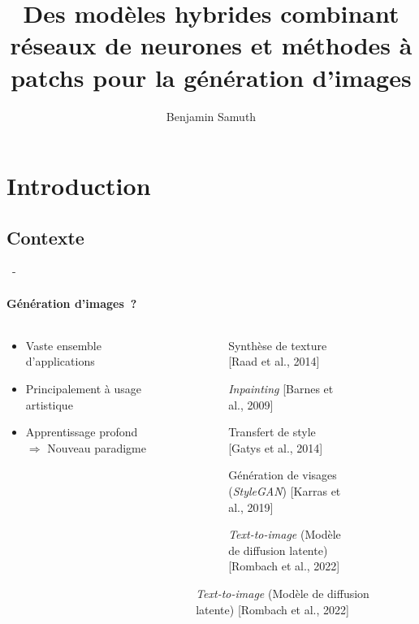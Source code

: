 \documentclass[aspectratio=169, 22pt]{beamer}
\title[Modèles hybrides pour la génération d'images]{Des modèles hybrides combinant réseaux de neurones et méthodes à patchs pour la génération d'images}
\subtitle{}
\author[Benjamin Samuth]{Benjamin Samuth}
\institute[Normandie University]{Normandie Univ, UNICAEN, ENSICAEN, CNRS, GREYC, Caen, FRANCE}
\begin{document}
\begin{frame}
  \titlepage
\end{frame}

\section{Introduction}

\subsection{Contexte}
\begin{frame}{\secname~- \subsecname}
  \framesubtitle{Génération d'images~?}
  \begin{columns}
    \begin{column}{0.5\linewidth}      
      \begin{itemize}
      \item Vaste ensemble d'applications
      \item Principalement à usage artistique
      \item Apprentissage profond $\Rightarrow$ \alert{Nouveau paradigme}
      \end{itemize}
    \end{column}
    \begin{column}{0.5\linewidth}
      \begin{figure}
        \begin{subfigure}{0.4\linewidth}
          \caption{Synthèse de texture [Raad et al., 2014]}
        \end{subfigure}
        \begin{subfigure}{0.4\linewidth}
          \caption{\emph{Inpainting} [Barnes et al., 2009]}
        \end{subfigure}
        
        \begin{subfigure}{0.4\linewidth}
          \caption{Transfert de style [Gatys et al., 2014]}
        \end{subfigure}
        \begin{subfigure}{0.4\linewidth}
          \caption{Génération de visages (\emph{StyleGAN}) [Karras et al., 2019]}
        \end{subfigure}
        
        \begin{subfigure}{0.4\linewidth}
          \caption{\emph{Text-to-image} (Modèle de diffusion latente) [Rombach et al., 2022]}
        \end{subfigure}
      \end{figure}
    \end{column}
  \end{columns}
\end{frame}
\end{document}
